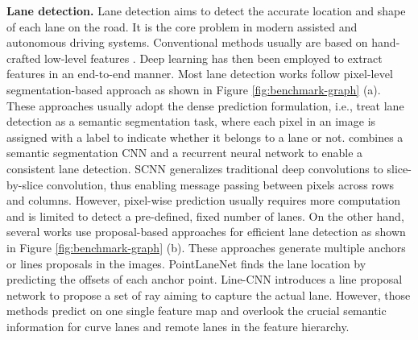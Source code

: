 \documentclass[runningheads]{llncs}
\begin{document}
\textbf{Lane detection. }Lane detection aims to detect the accurate
location and shape of each lane on the road. It is the core problem
in modern assisted and autonomous driving systems. Conventional methods
usually are based on hand-crafted low-level features \cite{chiu2005lane,lee2009effective,gonzalez2000lane}.
Deep learning has then been employed to extract features in an end-to-end
manner. Most lane detection works follow pixel-level segmentation-based
approach \cite{DBLP:journals/corr/abs-1907-01294,DBLP:journals/corr/abs-1905-03704,DBLP:journals/corr/abs-1909-00798,zou2019robust}
as shown in Figure \ref{fig:benchmark-graph} (a). These approaches
usually adopt the dense prediction formulation, i.e., treat lane detection
as a semantic segmentation task, where each pixel in an image is assigned
with a label to indicate whether it belongs to a lane or not. \cite{zou2019robust}
combines a semantic segmentation CNN and a recurrent neural network
to enable a consistent lane detection. SCNN \cite{pan2018spatial}
generalizes traditional deep convolutions to slice-by-slice convolution,
thus enabling message passing between pixels across rows and columns.
However, pixel-wise prediction usually requires more computation and
is limited to detect a pre-defined, fixed number of lanes. On the
other hand, several works\textbf{ }use proposal-based approaches for
efficient lane detection as shown in Figure \ref{fig:benchmark-graph}
(b). These approaches generate multiple anchors or lines proposals
in the images. PointLaneNet \cite{chen2019pointlanenet} finds the
lane location by predicting the offsets of each anchor point. Line-CNN
\cite{li2019line} introduces a line proposal network to propose a
set of ray aiming to capture the actual lane. However, those methods
predict on one single feature map and overlook the crucial semantic
information for curve lanes and remote lanes in the feature hierarchy.
\end{document}
